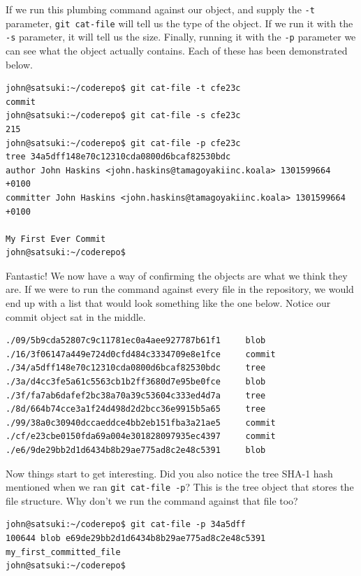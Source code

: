 If we run this plumbing command against our object, and supply the \texttt{-t} parameter, \texttt{git cat-file} will tell us the type of the object.  If we run it with the \texttt{-s} parameter, it will tell us the size.  Finally, running it with the \texttt{-p} parameter we can see what the object actually contains.  Each of these has been demonstrated below.

\begin{Verbatim}[frame=leftline,framerule=1mm,fontsize=\relsize{-3}]
john@satsuki:~/coderepo$ git cat-file -t cfe23c
commit
john@satsuki:~/coderepo$ git cat-file -s cfe23c
215
john@satsuki:~/coderepo$ git cat-file -p cfe23c
tree 34a5dff148e70c12310cda0800d6bcaf82530bdc
author John Haskins <john.haskins@tamagoyakiinc.koala> 1301599664 +0100
committer John Haskins <john.haskins@tamagoyakiinc.koala> 1301599664 +0100

My First Ever Commit
john@satsuki:~/coderepo$ 
\end{Verbatim}

Fantastic!  We now have a way of confirming the objects are what we think they are.  If we were to run the command against every file in the repository, we would end up with a list that would look something like the one below.  Notice our commit object sat in the middle.

\begin{Verbatim}[frame=leftline,framerule=1mm,fontsize=\relsize{-3}]
./09/5b9cda52807c9c11781ec0a4aee927787b61f1     blob
./16/3f06147a449e724d0cfd484c3334709e8e1fce     commit
./34/a5dff148e70c12310cda0800d6bcaf82530bdc		tree
./3a/d4cc3fe5a61c5563cb1b2ff3680d7e95be0fce		blob
./3f/fa7ab6dafef2bc38a70a39c53604c333ed4d7a		tree
./8d/664b74cce3a1f24d498d2d2bcc36e9915b5a65		tree
./99/38a0c30940dccaeddce4bb2eb151fba3a21ae5     commit
./cf/e23cbe0150fda69a004e301828097935ec4397     commit
./e6/9de29bb2d1d6434b8b29ae775ad8c2e48c5391		blob
\end{Verbatim}

Now things start to get interesting.  Did you also notice the tree SHA-1 hash mentioned when we ran \texttt{git cat-file -p}?  This is the tree object that stores the file structure.  Why don't we run the command against that file too?

\begin{Verbatim}[frame=leftline,framerule=1mm,fontsize=\relsize{-3}]
john@satsuki:~/coderepo$ git cat-file -p 34a5dff
100644 blob e69de29bb2d1d6434b8b29ae775ad8c2e48c5391	my_first_committed_file
john@satsuki:~/coderepo$ 
\end{Verbatim}

